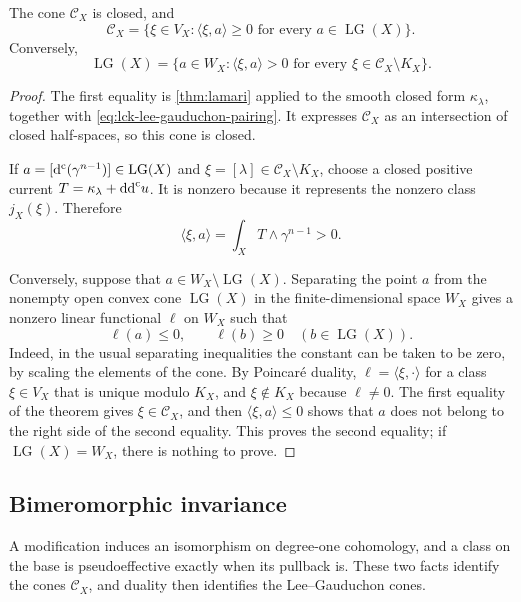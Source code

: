 \begin{theorem}\label{thm:lee-gauduchon-duality}
The cone $\mathcal C_X$ is closed, and
\[
 \mathcal C_X
 =\{\xi\in V_X:\langle\xi,a\rangle\geq0
                         \text{ for every }a\in\operatorname{LG}(X)\}.
\]
Conversely,
\[
 \operatorname{LG}(X)
 =\{a\in W_X:\langle\xi,a\rangle>0
                         \text{ for every }\xi\in\mathcal C_X\setminus K_X\}.
\]
\end{theorem}
\begin{proof}
The first equality is \cref{thm:lamari} applied to the smooth closed form $\kappa_\lambda$, together with \eqref{eq:lck-lee-gauduchon-pairing}. It expresses $\mathcal C_X$ as an intersection of closed half-spaces, so this cone is closed.

If $a=[\mathrm d^{\mathrm c}(\gamma^{n-1})]\in\operatorname{LG}(X)$ and $\xi=[\lambda]\in\mathcal C_X\setminus K_X$, choose a closed positive current $T=\kappa_\lambda+\mathrm{dd}^{\mathrm{c}} u$. It is nonzero because it represents the nonzero class $j_X(\xi)$. Therefore
\[
 \langle\xi,a\rangle
 =\int_XT\wedge\gamma^{n-1}>0.
\]

Conversely, suppose that $a\in W_X\setminus\operatorname{LG}(X)$. Separating the point $a$ from the nonempty open convex cone $\operatorname{LG}(X)$ in the finite-dimensional space $W_X$ gives a nonzero linear functional $\ell$ on $W_X$ such that
\[
 \ell(a)\leq0,\qquad \ell(b)\geq0
                   \quad(b\in\operatorname{LG}(X)).
\]
Indeed, in the usual separating inequalities the constant can be taken to be zero, by scaling the elements of the cone. By Poincar\'e duality, $\ell=\langle\xi,\cdot\rangle$ for a class $\xi\in V_X$ that is unique modulo $K_X$, and $\xi\notin K_X$ because $\ell\neq0$. The first equality of the theorem gives $\xi\in\mathcal C_X$, and then $\langle\xi,a\rangle\leq0$ shows that $a$ does not belong to the right side of the second equality. This proves the second equality; if $\operatorname{LG}(X)=W_X$, there is nothing to prove.
\end{proof}

\subsection{Bimeromorphic invariance}

A modification induces an isomorphism on degree-one cohomology, and a class on the base is pseudoeffective exactly when its pullback is. These two facts identify the cones $\mathcal C_X$, and duality then identifies the Lee--Gauduchon cones.

